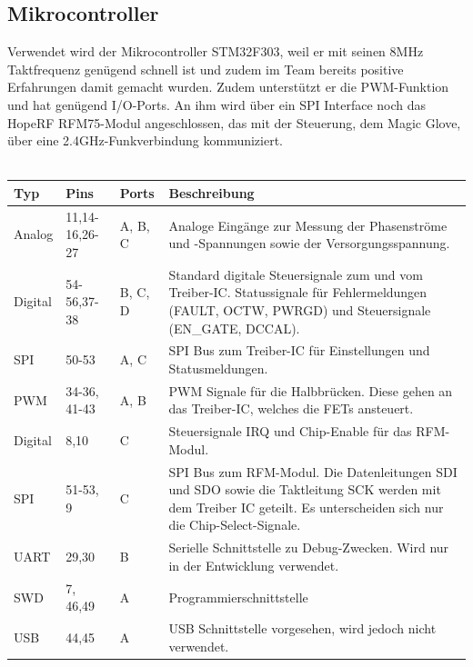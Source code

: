 \subsection*{Mikrocontroller}
Verwendet wird der Mikrocontroller STM32F303, weil er mit seinen 8MHz Taktfrequenz genügend schnell ist und zudem im Team bereits positive Erfahrungen damit gemacht wurden. Zudem unterstützt er die PWM-Funktion und hat genügend I/O-Ports.
An ihm wird über ein SPI Interface noch das HopeRF RFM75-Modul angeschlossen, das mit der Steuerung, dem Magic Glove, über eine 2.4GHz-Funkverbindung kommuniziert.
\\
\\
\begin{tabularx}{\textwidth}{l|l|l|X}
	Typ & Pins & Ports & Beschreibung \\ \hline
	Analog & 
	11,14-16,26-27 & 
	A, B, C &
	Analoge Eingänge zur Messung der Phasenströme und -Spannungen sowie der Versorgungsspannung.
	\\ \hline
	Digital & 
	54-56,37-38 &
	B, C, D &
	Standard digitale Steuersignale zum und vom Treiber-IC. Statussignale für Fehlermeldungen (FAULT, OCTW, PWRGD) und Steuersignale (EN\_GATE, DCCAL).
	\\ \hline
	SPI &
	50-53 &
	A, C &
	SPI Bus zum Treiber-IC für Einstellungen und Statusmeldungen.
	\\ \hline
	PWM &
	34-36, 41-43 &
	A, B &
	PWM Signale für die Halbbrücken. Diese gehen an das Treiber-IC, welches die FETs ansteuert.
	\\ \hline
	Digital &
	8,10 &
	C &
	Steuersignale IRQ und Chip-Enable für das RFM-Modul.
	\\ \hline
	SPI &
	51-53, 9 &
	C &
	SPI Bus zum RFM-Modul. Die Datenleitungen SDI und SDO sowie die Taktleitung SCK werden mit dem Treiber IC geteilt. Es unterscheiden sich nur die Chip-Select-Signale.
	\\ \hline
	UART &
	29,30 &
	B &
	Serielle Schnittstelle zu Debug-Zwecken. Wird nur in der Entwicklung verwendet.
	\\ \hline
	SWD &
	7, 46,49 &
	A &
	Programmierschnittstelle
	\\ \hline
	USB &
	44,45 &
	A &
	USB Schnittstelle vorgesehen, wird jedoch nicht verwendet.
	\\ \hline
\end{tabularx}
\label{tab:iomc}

